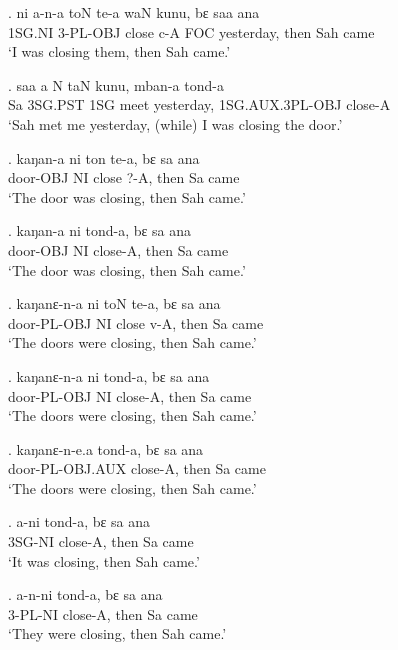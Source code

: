 \documentclass{assets/fieldnotes}
\begin{document}
\exg.
ni       a-n-a      toN     te-a   waN   kunu,        bɛ     saa   ana  \\
1SG.NI   3-PL-OBJ   close   c-A    FOC   yesterday,   then   Sah   came \\%
`I was closing them, then Sah came.'

\exg.
saa   a     N     taN    kunu,        mban-a            tond-a  \\
Sa    3SG.PST   1SG   meet   yesterday,   1SG.AUX.3PL-OBJ   close-A \\%
`Sah met me yesterday, (while) I was closing the door.'

\exg.
kaŋan-a    ni   ton     te-a,   bɛ     sa   ana  \\
door-OBJ   NI   close   ?-A,    then   Sa   came \\%
`The door was closing, then Sah came.'

\exg.
kaŋan-a    ni   tond-a,    bɛ     sa   ana  \\
door-OBJ   NI   close-A,   then   Sa   came \\%
`The door was closing, then Sah came.'

\exg.
kaŋanɛ-n-a    ni   toN     te-a,   bɛ     sa   ana  \\
door-PL-OBJ   NI   close   v-A,    then   Sa   came \\%
`The doors were closing, then Sah came.'

\exg.
kaŋanɛ-n-a    ni   tond-a,    bɛ     sa   ana  \\
door-PL-OBJ   NI   close-A,   then   Sa   came \\%
`The doors were closing, then Sah came.'

\exg.
kaŋanɛ-n-e.a      tond-a,    bɛ     sa   ana  \\
door-PL-OBJ.AUX   close-A,   then   Sa   came \\%
`The doors were closing, then Sah came.'

\exg.
a-ni     tond-a,    bɛ     sa   ana  \\ 
3SG-NI   close-A,   then   Sa   came \\%
`It was closing, then Sah came.' \label{10893}

\exg.
a-n-ni     tond-a,    bɛ     sa   ana  \\ 
3-PL-NI   close-A,   then   Sa   came \\%
`They were closing, then Sah came.' \label{59676}

\end{document}
